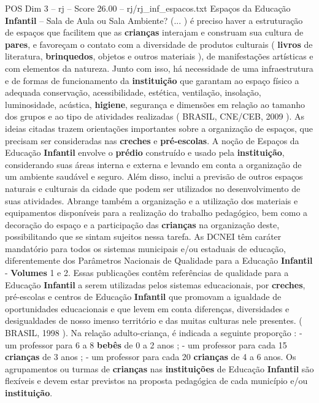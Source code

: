 \begin{textsample}{POS Dim 3 – rj – Score 26.00 – rj/rj\_inf\_espacos.txt}  \label{ex:f3_pos_006}
Espaços da Educação \textbf{Infantil} – Sala de Aula ou Sala Ambiente? (... ) é preciso haver a estruturação de espaços que facilitem que as \textbf{crianças} interajam e construam sua cultura de \textbf{pares}, e favoreçam o contato com a diversidade de produtos culturais ( \textbf{livros} de literatura, \textbf{brinquedos}, objetos e outros materiais ), de manifestações artísticas e com elementos da natureza.
Junto com isso, há necessidade de uma infraestrutura e de formas de funcionamento da \textbf{instituição} que garantam ao espaço físico a adequada conservação, acessibilidade, estética, ventilação, insolação, luminosidade, acústica, \textbf{higiene}, segurança e dimensões em relação ao tamanho dos grupos e ao tipo de atividades realizadas ( BRASIL, CNE/CEB, 2009 ).
As ideias citadas trazem orientações importantes sobre a organização de espaços, que precisam ser consideradas nas \textbf{creches} e \textbf{pré-escolas}.
A noção de Espaços da Educação \textbf{Infantil} envolve o \textbf{prédio} construído e usado pela \textbf{instituição}, considerando suas áreas interna e externa e levando em conta a organização de um ambiente saudável e seguro.
Além disso, inclui a previsão de outros espaços naturais e culturais da cidade que podem ser utilizados no desenvolvimento de suas atividades.
Abrange também a organização e a utilização dos materiais e equipamentos disponíveis para a realização do trabalho pedagógico, bem como a decoração do espaço e a participação das \textbf{crianças} na organização deste, possibilitando que se sintam sujeitos nessa tarefa.
As DCNEI têm caráter mandatório para todos os sistemas municipais e/ou estaduais de educação, diferentemente dos Parâmetros Nacionais de Qualidade para a Educação \textbf{Infantil} - \textbf{Volumes} 1 e 2.
Essas publicações contêm referências de qualidade para a Educação \textbf{Infantil} a serem utilizadas pelos sistemas educacionais, por \textbf{creches}, pré-escolas e centros de Educação \textbf{Infantil} que promovam a igualdade de oportunidades educacionais e que levem em conta diferenças, diversidades e desigualdades de nosso imenso território e das muitas culturas nele presentes. ( BRASIL, 1998 ).
Na relação adulto-criança, é indicada a seguinte proporção : - um professor para 6 a 8 \textbf{bebês} de 0 a 2 anos ; - um professor para cada 15 \textbf{crianças} de 3 anos ; - um professor para cada 20 \textbf{crianças} de 4 a 6 anos.
Os agrupamentos ou turmas de \textbf{crianças} nas \textbf{instituições} de Educação \textbf{Infantil} são flexíveis e devem estar previstos na proposta pedagógica de cada município e/ou \textbf{instituição}.

\end{textsample}
